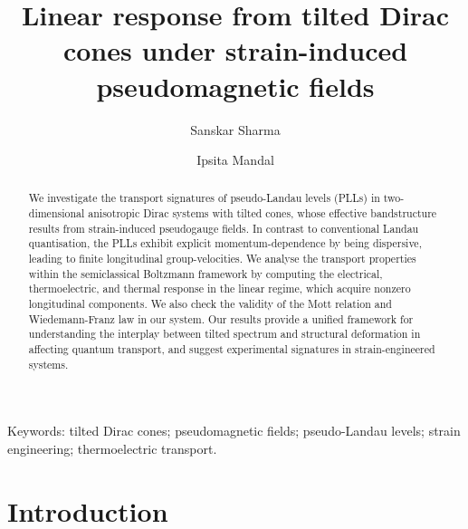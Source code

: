 \documentclass[aps,prb, onecolumn, nofootinbib, citeautoscript,10pt]{revtex4-2}
\begin{document}
\title{Linear response from tilted Dirac cones under strain-induced pseudomagnetic fields}



\author{Sanskar Sharma}
\author{Ipsita Mandal}



\begin{abstract}
We investigate the transport signatures of pseudo-Landau levels (PLLs) in two-dimensional anisotropic Dirac systems with tilted cones, whose effective bandstructure results from strain-induced pseudogauge fields. In contrast to conventional Landau quantisation, the PLLs exhibit explicit momentum-dependence by being dispersive, leading to finite longitudinal group-velocities. We analyse the transport properties within the semiclassical Boltzmann framework by computing the electrical, thermoelectric, and thermal response in the linear regime, which acquire nonzero longitudinal components. We also check the validity of the Mott relation and Wiedemann-Franz law in our system. Our results provide a unified framework for understanding the interplay between tilted spectrum and structural deformation in affecting quantum transport, and suggest experimental signatures in strain-engineered systems.
\end{abstract}


\maketitle

\vspace{0.5em}
\noindent Keywords: tilted Dirac cones; pseudomagnetic fields; pseudo-Landau levels; strain engineering; thermoelectric transport.




\section{Introduction}
\end{document}
